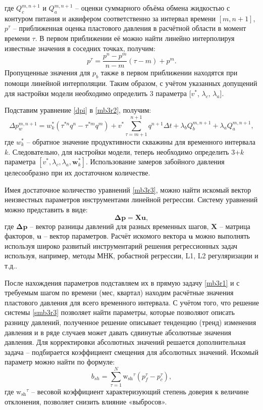 \documentclass[14pt]{article}
\begin{document}
где $Q^{m,n+1}_c$ и $Q^{m,n+1}_a$ -- оценки суммарного объёма обмена жидкостью с контуром питания и аквифером соответственно за интервал времени  $[m,n+1]$, $p^{\tau}$ -- приближенная оценка пластового давления в расчётной области в момент времени $\tau$. В первом приближении её можно найти линейно интерполируя известные значения в соседних точках, получим:
\begin{equation*}
	p^{\tau} = \frac{p^n - p^m}{n-m}\left(\tau-m\right) + p^m.
\end{equation*}
Пропущенные значения для $p_b$ также в первом приближении находятся при помощи линейной интерполяции. 
 Таким образом, с учётом указанных допущений для настройки модели необходимо определить 3 параметра $[v^*$, $\lambda_c$, $\lambda_a$]. 
 
Подставим уравнение \ref{dpi} в \ref{mb3r2}, получим:
\begin{equation}\label{mb3r3}
	\Delta p_w^{m,n+1} = w_k^* \left(\tau^{*n} q^n - \tau^{*m} q^m \right) + 
	 v^* \sum_{\tau=m+1}^{n+1}q^{n+1}\Delta t + \lambda_b Q^{m,n+1}_b + \lambda_a Q^{m,n+1}_a,
\end{equation}
где  $w_k^*$ -- обратное значение продуктивности скважины для временного интервала $k$.
Следовательно, для настройки модели, теперь необходимо определить 3+$k$ параметра $[v^*, \lambda_c, \lambda_a, \boldsymbol{w}^*_k]$. Использование замеров забойного давления целесообразно при их достаточном количестве. 

Имея достаточное количество уравнений \ref{mb3r3}, можно найти искомый вектор неизвестных параметров инструментами линейной регрессии. Систему уравнений можно представить в виде:
\begin{equation}\label{smb3r3}
\boldsymbol{\Delta p} = \boldsymbol{X} \boldsymbol{u},
\end{equation}
где $\boldsymbol{\Delta p}$ -- вектор разницы давлений для разных временных шагов, $\boldsymbol{X}$ -- матрица факторов, $\boldsymbol{u}$ -- вектор параметров. 
Расчёт искомого вектора $\boldsymbol{u}$ можно выполнять используя широко развитый инструментарий решения регрессионных задач используя, например, методы МНК, робастной регрессии, L1, L2 регуляризации и т.д..

После нахождения параметров подставляем их в прямую задачу \ref{mb3r1} и с требуемым шагом по времени (мес, квартал) находим расчётные значения пластового давления для всего временного интервала. С учётом того, что решение системы \ref{smb3r3} позволяет найти параметры, которые позволяют описать разницу давлений, полученное решение описывает тенденцию (тренд) изменения давления и в ряде случаев может давать сдвинутые абсолютные значения давления. Для корректировки абсолютных значений решается дополнительная задача -- подбирается коэффициент смещения для абсолютных значений. Искомый параметр можно найти по формуле:
\begin{equation}\label{shift}
	 b_{sh} = \sum_{ \tau=1}^{N}\mathrm{w_{sh}}^\tau\left(p^{\tau}_f - p^{\tau}_c \right),
\end{equation}
где $\mathrm{w_{sh}}^\tau$ -- весовой коэффициент характеризующий степень доверия к величине отклонения, позволяет снизить влияние «выбросов».
\end{document}
